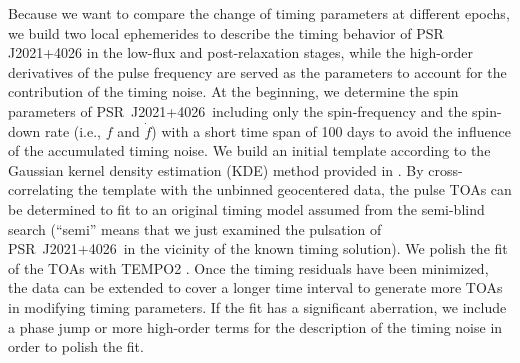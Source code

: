 \documentclass[12pt,preprint]{aastex}
\newcommand{\psr}{PSR~J2021+4026}
\begin{document}
{Because we want to compare the change of timing parameters at different epochs, we build two local ephemerides to describe the timing behavior of PSR J2021+4026 in the low-flux and post-relaxation stages, while the high-order derivatives of the pulse frequency are served as the parameters to account for the contribution of the timing noise.
At the beginning, we determine the spin parameters of \psr\ including only the spin-frequency and the spin-down rate (i.e., $f$ and $\dot{f}$) with a short time span of 100 days to avoid the influence of the accumulated timing noise.}
We build an initial template according to the Gaussian kernel density estimation (KDE) method \citep{DRS86} provided in \citet{Ray2011}.
By cross-correlating the template with the unbinned geocentered data, the pulse TOAs can be determined to fit to an original timing model assumed from the semi-blind search (``semi'' means that we just examined the pulsation of \psr\ in the vicinity of the known timing solution).
We polish the fit of the TOAs with TEMPO2 \citep{Hobbs2006,EHM2006}.
Once the timing residuals have  been minimized, the data can be extended to cover a longer time interval to generate more TOAs in modifying timing parameters.
If the fit has a significant aberration, we  include a phase jump or more high-order terms for the description of the timing noise in order to polish the fit.
\end{document}
